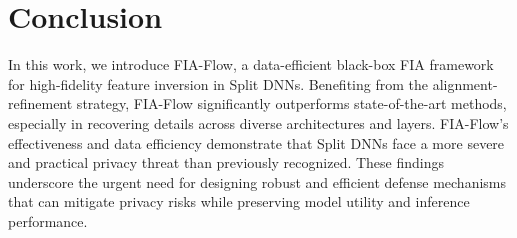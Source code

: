\section{Conclusion}
In this work, we introduce FIA-Flow, a data-efficient black-box FIA framework for high-fidelity feature inversion in Split DNNs.
Benefiting from the alignment-refinement strategy, FIA-Flow significantly outperforms state-of-the-art methods, especially in recovering details across diverse architectures and layers.
FIA-Flow's effectiveness and data efficiency demonstrate that Split DNNs face a more severe and practical privacy threat than previously recognized.
These findings underscore the urgent need for designing robust and efficient defense mechanisms that can mitigate privacy risks while preserving model utility and inference performance.
\par